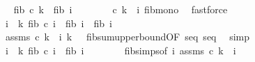 \begin{isabellebody}
\ \isamarkupfalse%
\ {\isachardoublequoteopen}fib\ {\isacharparenleft}{\kern0pt}c\ k{\isacharparenright}{\kern0pt}\ {\isasymle}\ fib\ {\isacharparenleft}{\kern0pt}i{\isacharminus}{\kern0pt}{}{\isacharparenright}{\kern0pt}{\isachardoublequoteclose}\isanewline
\ \ \ \ \ \ \isamarkupfalse%
\ {\isacartoucheopen}c\ k\ {\isacharless}{\kern0pt}\ i{\isacartoucheclose}\ fib{\isacharunderscore}{\kern0pt}mono\ \isamarkupfalse%
\ fastforce\isanewline
\ \ \ \ \isamarkupfalse%
\ \isamarkupfalse%
\ {\isachardoublequoteopen}{\isacharparenleft}{\kern0pt}{\isasymSum}i\ {\isacharequal}{\kern0pt}\ {}{\isachardot}{\kern0pt}{\isachardot}{\kern0pt}k{\isachardot}{\kern0pt}\ fib\ {\isacharparenleft}{\kern0pt}c\ i{\isacharparenright}{\kern0pt}{\isacharparenright}{\kern0pt}\ {\isacharless}{\kern0pt}\ fib\ {\isacharparenleft}{\kern0pt}i{\isacharminus}{\kern0pt}{}{\isacharparenright}{\kern0pt}\ {\isacharplus}{\kern0pt}\ fib\ {\isacharparenleft}{\kern0pt}i{\isacharminus}{\kern0pt}{}{\isacharparenright}{\kern0pt}{\isachardoublequoteclose}\isanewline
\ \ \ \ \ \ \isamarkupfalse%
\ assms\ {\isacartoucheopen}c\ k\ {\isacharless}{\kern0pt}\ i{\isacartoucheclose}\ {\isacartoucheopen}k\ {\isachargreater}{\kern0pt}\ {}{\isacartoucheclose}\ fib{\isacharunderscore}{\kern0pt}sum{\isacharunderscore}{\kern0pt}upper{\isacharunderscore}{\kern0pt}bound{\isacharbrackleft}{\kern0pt}OF\ seq{\isacharparenleft}{\kern0pt}{}{\isacharparenright}{\kern0pt}\ seq{\isacharparenleft}{\kern0pt}{}{\isacharparenright}{\kern0pt}{\isacharbrackright}{\kern0pt}\ \isamarkupfalse%
\ simp\isanewline
\ \ \ \ \isamarkupfalse%
\ {\isachardoublequoteopen}{\isacharparenleft}{\kern0pt}{\isasymSum}i\ {\isacharequal}{\kern0pt}\ {}{\isachardot}{\kern0pt}{\isachardot}{\kern0pt}k{\isachardot}{\kern0pt}\ fib\ {\isacharparenleft}{\kern0pt}c\ i{\isacharparenright}{\kern0pt}{\isacharparenright}{\kern0pt}\ {\isacharless}{\kern0pt}\ fib\ i{\isachardoublequoteclose}\isanewline
\ \ \ \ \ \ \isamarkupfalse%
\ fib{\isachardot}{\kern0pt}simps{\isacharparenleft}{\kern0pt}{}{\isacharparenright}{\kern0pt}{\isacharbrackleft}{\kern0pt}of\ {\isachardoublequoteopen}i{\isacharminus}{\kern0pt}{}{\isachardoublequoteclose}{\isacharbrackright}{\kern0pt}\ assms{\isacharparenleft}{\kern0pt}{}{\isacharparenright}{\kern0pt}\ {\isacartoucheopen}c\ k\ {\isacharless}{\kern0pt}\ i{\isacartoucheclose}\ \isanewline

\end{isabellebody}
